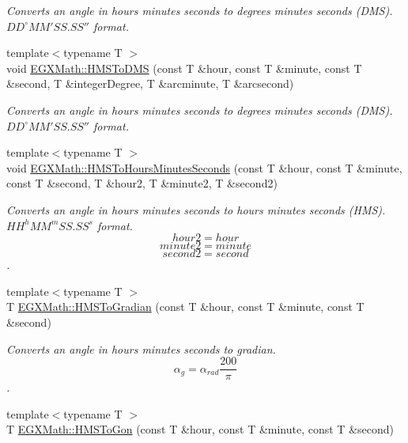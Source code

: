 \begin{DoxyCompactItemize}
\begin{DoxyCompactList}\small\item\em Converts an angle in hours minutes seconds to degrees minutes seconds (D\+MS). ${DD}^{\circ}{MM}'{SS.SS}''$ format. \end{DoxyCompactList}\item 
{\footnotesize template$<$typename T $>$ }\\void \mbox{\hyperlink{group___e_g_x_math-_conversions-_angle_conversions-_h_m_s_ga7a875e85b32c4d7a8c6fa9a833f2bf7a}{E\+G\+X\+Math\+::\+H\+M\+S\+To\+D\+MS}} (const T \&hour, const T \&minute, const T \&second, T \&integer\+Degree, T \&arcminute, T \&arcsecond)
\begin{DoxyCompactList}\small\item\em Converts an angle in hours minutes seconds to degrees minutes seconds (D\+MS). ${DD}^{\circ}{MM}'{SS.SS}''$ format. \end{DoxyCompactList}\item 
{\footnotesize template$<$typename T $>$ }\\void \mbox{\hyperlink{group___e_g_x_math-_conversions-_angle_conversions-_h_m_s_gaf9acea32cca77104b92fe10fe0d1595f}{E\+G\+X\+Math\+::\+H\+M\+S\+To\+Hours\+Minutes\+Seconds}} (const T \&hour, const T \&minute, const T \&second, T \&hour2, T \&minute2, T \&second2)
\begin{DoxyCompactList}\small\item\em Converts an angle in hours minutes seconds to hours minutes seconds (H\+MS). ${HH}^h{MM}^m{SS.SS}^s$ format. \[hour2 = hour \] \[minute2 = minute\] \[second2 = second\]. \end{DoxyCompactList}\item 
{\footnotesize template$<$typename T $>$ }\\T \mbox{\hyperlink{group___e_g_x_math-_conversions-_angle_conversions-_h_m_s_ga89aaece52b0760559444d0303bee3bf1}{E\+G\+X\+Math\+::\+H\+M\+S\+To\+Gradian}} (const T \&hour, const T \&minute, const T \&second)
\begin{DoxyCompactList}\small\item\em Converts an angle in hours minutes seconds to gradian. \[\alpha_{g}=\alpha_{rad}\frac{200}{\pi}\]. \end{DoxyCompactList}\item 
{\footnotesize template$<$typename T $>$ }\\T \mbox{\hyperlink{group___e_g_x_math-_conversions-_angle_conversions-_h_m_s_ga7751b1ea9b1874096023286240a91068}{E\+G\+X\+Math\+::\+H\+M\+S\+To\+Gon}} (const T \&hour, const T \&minute, const T \&second)

\end{DoxyCompactItemize}
